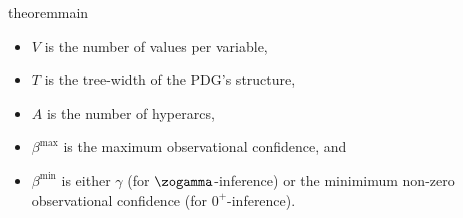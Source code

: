 \begin{linked}{theorem}{main}
\begin{itemize}[nosep,%
            ]
        \item $V$ is the number of values per variable,
        \item $T$ is the tree-width of the PDG's structure, 
        \item $A$ is the number of hyperarcs,
        \item $\beta^{\max}$ is the maximum observational confidence,
        and
        \item $\beta^{\min}$ is either $\gamma$ (for $\zogamma$-inference)
         or the minimimum non-zero observational confidence (for $0^+$-inference).
    \end{itemize}
\end{linked}



